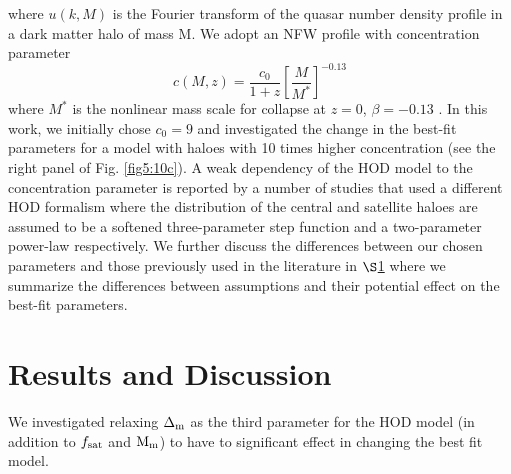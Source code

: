 \documentclass[useAMS,usenatbib]{mn2e}
\begin{document}
where $u(k,M)$ is the Fourier transform of the quasar number density profile in 
a dark matter halo of mass M. We adopt an NFW profile \citep{nfw97} with 
concentration parameter
\begin{equation}
c(M,z) = \frac{c_{0}}{1+z}[\frac{M}{M^{*}}]^{-0.13}
\end{equation}
 where $M^{*}$ is the nonlinear mass scale for collapse at $z=0$, $\beta = 
-0.13$ \citep{cs02}. In this work, we initially chose $c_0=9$ and investigated 
the change in the best-fit parameters for a model with haloes with 10 times 
higher concentration (see the right panel of Fig. \ref{fig5:10c}). A weak 
dependency of the HOD model to the concentration parameter is reported by a 
number of studies \citep{ric12,ric13,sh13} that used a different HOD formalism 
where the distribution of the central and satellite haloes are assumed to be a 
softened three-parameter step function and a two-parameter power-law 
respectively.
 We further discuss the differences between our chosen parameters and those 
previously used in the literature in $\S$\ref{res} where we summarize the 
differences between assumptions and their potential effect on the best-fit 
parameters.    

\section{Results and Discussion}\label{res}
 We investigated relaxing $\Delta_{\rm m}$ as the third parameter 
for the HOD model (in addition to $f_{\rm sat}$ and $\rm M_{m}$) to have to significant effect in changing the best fit model.
\end{document}
